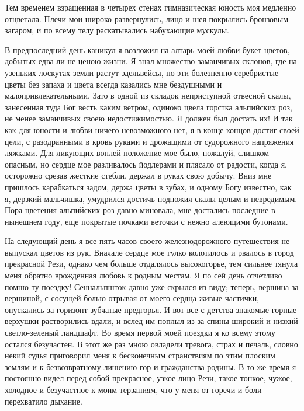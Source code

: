 Тем  временем взращенная  в  четырех стенах  гимназическая юность  моя
медленно  отцветала.  Плечи  мои   широко  развернулись,  лицо  и  шея
покрылись бронзовым загаром, и  по всему телу раскатывались набухающие
мускулы.

В предпоследний  день каникул  я возложил на  алтарь моей  любви букет
цветов, добытых  едва ли не  ценою жизни. Я знал  множество заманчивых
склонов,  где на  узеньких лоскутах  земли растут  эдельвейсы, но  эти
болезненно-серебристые  цветы  без  запаха  и  цвета  всегда  казались
мне  бездушными  и  малопривлекательными.  Зато  в  одной  из  складок
неприступной отвесной  скалы, занесенная туда Бог  весть каким ветром,
одиноко  цвела  горстка  альпийских  роз, не  менее  заманчивых  своею
недостижимостью. Я должен был достать их! И так как для юности и любви
ничего  невозможного  нет, я  в  конце  концов  достиг своей  цели,  с
разодранными  в кровь  руками  и дрожащими  от судорожного  напряжения
ляжками.  Для ликующих  воплей  положение мое  было, пожалуй,  слишком
опасным, но  сердце мое  разливалось йодлерами  и плясало  от радости,
когда я, осторожно срезав жесткие  стебли, держал в руках свою добычу.
Вниз мне  пришлось карабкаться  задом, держа цветы  в зубах,  и одному
Богу известно,  как я,  дерзкий мальчишка, умудрился  достичь подножия
скалы целым и невредимым. Пора цветения альпийских роз давно миновала,
мне достались последние в нынешнем  году, еще покрытые почками веточки
с нежно алеющими бутонами.

На следующий день я все пять часов своего железнодорожного путешествия
не  выпускал  цветов  из  рук. Вначале  сердце  мое  гулко  колотилось
и  рвалось  в город  прекрасной  Рези,  однако чем  больше  отдалялось
высокогорье,  тем  сильнее тянула  меня  обратно  врожденная любовь  к
родным местам. Я по сей  день отчетливо помню ту поездку! Сеннальпшток
давно  уже скрылся  из виду;  теперь, вершина  за вершиной,  с сосущей
болью отрывая от  моего сердца живые частички,  опускались за горизонт
зубчатые  предгорья. И  вот  все с  детства  знакомые горные  верхушки
растворились вдали,  и вслед  им поплыл из-за  спины широкий  и низкий
светло-зеленый ландшафт. Во время первой моей поездки я ко всему этому
остался  безучастен. В  этот же  раз  мною овладели  тревога, страх  и
печаль, словно  некий судья приговорил меня  к бесконечным странствиям
по этим  плоским землям и  к безвозвратному лишению гор  и гражданства
родины. В то же время я  постоянно видел перед собой прекрасное, узкое
лицо  Рези,  такое  тонкое,  чужое,  холодное  и  безучастное  к  моим
терзаниям, что у меня от горечи и боли перехватило дыхание.

